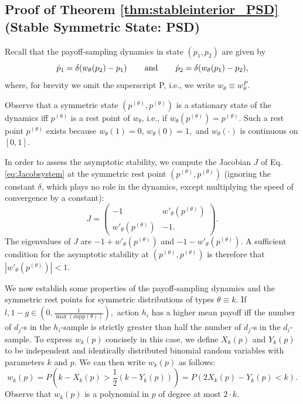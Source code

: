 \documentclass[12pt]{article}
\numberwithin{equation}{section}
\numberwithin{figure}{section}
\theoremstyle{definition}
\theoremstyle{plain}
\theoremstyle{plain}
\theoremstyle{plain}
\theoremstyle{remark}
\theoremstyle{plain}
\theoremstyle{plain}
\begin{document}
\subsection{Proof of Theorem \ref{thm:stableinterior_PSD} (Stable Symmetric State: PSD)}\label{subsec:stableinterior_PSDproof}
Recall that the payoff-sampling dynamics in state $(p_1,p_2)$ are given by
\begin{equation}\label{eq:Jacobsystem}
    \dot{p}_1 = \delta(w_\theta(p_2) - p_1) \hspace{0.3in} \text{and} \hspace{0.3in}
    \dot{p}_2  = \delta(w_\theta(p_1) - p_2),
\end{equation}
where, for brevity we omit the superscript P, i.e., we write $w_\theta \equiv w^P_\theta.$

Observe that a symmetric state $(p^{(\theta)},p^{(\theta)})$ is a stationary state of the dynamics iff $p^{(\theta)}$ is a rest point of $w_\theta$, i.e., if $w_\theta (p^{(\theta)})=p^{(\theta)}$. Such a rest point $p^{(\theta)}$ exists because $w_\theta(1)=0$,  $w_\theta(0)=1,$ and $w_\theta(\cdot)$ is continuous on $[0,1].$ 

In order to assess the asymptotic stability, we compute the Jacobian $J$ of 
Eq. \eqref{eq:Jacobsystem} at the symmetric rest point $(p^{(\theta)}, p^{(\theta)})$ (ignoring the constant $\delta$, which plays no role in the dynamics, except multiplying the speed of convergence by a constant): 
$$
J =  \left( \begin{array}{cc}
-1 & w'_\theta(p^{(\theta)})  \\
w'_\theta(p^{(\theta)}) & -1.  \end{array} \right).
$$
The eigenvalues of $J$ are $-1+w'_\theta(p^{(\theta)})$ and $-1-w'_\theta(p^{(\theta)}).$ A sufficient condition for the asymptotic stability at $(p^{(\theta)}, p^{(\theta)})$ is therefore that $|w'_\theta(p^{(\theta)})| < 1.$


We now establish some properties of the payoff-sampling dynamics and the symmetric rest points for symmetric distributions of types $\theta \equiv k$. 
If $l,1-g \in \left(0, \frac{1}{\max(\textrm{supp}(\theta))}\right),$ action $h_i$ has a higher mean payoff iff the number of $d_j$-s in the $h_i$-sample is strictly greater than half the number of $d_j$-s in the $d_i$-sample. To express $w_k(p)$ concisely in this case, we define $X_k(p)$ and $Y_k(p)$ to be independent and identically distributed binomial random variables with parameters $k$ and $p.$ We can then write $w_k(p)$ as follows:
\begin{equation}
w_k(p) = P\left(k-X_k(p) > \frac{1}{2}(k-Y_k(p))\right)= P(2X_k(p)-Y_k(p) < k).
\end{equation}
Observe that $w_k(p)$ is a polynomial in $p$ of degree at most $2\cdot k.$
\end{document}
